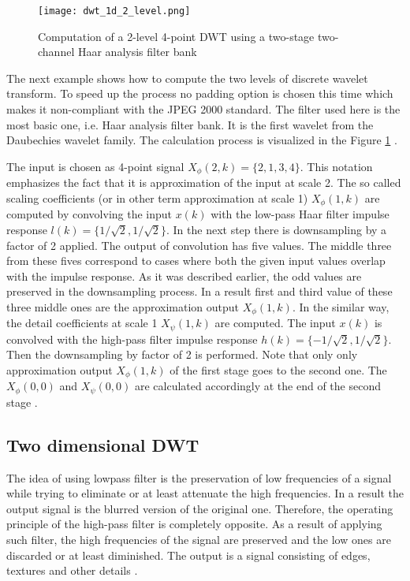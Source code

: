 \begin{figure}
    \centering
    \texttt{[image: dwt\_1d\_2\_level.png]}
    \caption{Computation of a 2-level 4-point DWT using a two-stage two-channel Haar analysis filter bank \cite{dwt_impl}}
    \label{fig:dwt_1d_2_level}
\end{figure}

The next example shows how to compute the two levels of discrete wavelet transform. To speed up the process
no padding option is chosen this time which makes it non-compliant with the JPEG 2000 standard.
The filter used here is the most basic one, i.e. Haar analysis filter bank. It is the first wavelet
from the Daubechies wavelet family. The calculation process is visualized in the Figure \ref{fig:dwt_1d_2_level} \cite{dwt_impl}.

The input is chosen as 4-point signal $X_{\phi}(2, k) = \{2, 1, 3, 4\}$. This notation emphasizes the fact
that it is approximation of the input at scale 2. The so called scaling coefficients (or in other term
approximation at scale 1) $X_{\phi}(1, k)$ are computed by convolving the input $x(k)$ with the low-pass
Haar filter impulse response $l(k) = \{1/\sqrt{2}, 1/\sqrt{2}\}$. In the next step there is downsampling
by a factor of 2 applied. The output of convolution has five values. The middle three from these fives 
correspond to cases where both the given input values overlap with the impulse response. As it was described
earlier, the odd values are preserved in the downsampling process. In a result first and third value of these
three middle ones are the approximation output $X_{\phi}(1, k)$. In the similar way, the detail coefficients
at scale 1 $X_{\psi}(1, k)$ are computed. The input $x(k)$ is convolved with the high-pass filter impulse
response $h(k) = \{-1/\sqrt{2}, 1/\sqrt{2}\}$. Then the downsampling by factor of 2 is performed.
Note that only only approximation output $X_{\phi}(1, k)$ of the first stage goes to the second one.
The $X_{\phi}(0, 0)$ and $X_{\psi}(0, 0)$ are calculated accordingly at the end of the second stage \cite{dwt_impl}.

\subsection{Two dimensional DWT}

The idea of using lowpass filter is the preservation of low frequencies of a signal while trying
to eliminate or at least attenuate the high frequencies. In a result the output signal is the blurred
version of the original one. Therefore, the operating principle of the high-pass filter is completely
opposite. As a result of applying such filter, the high frequencies of the signal are preserved and
the low ones are discarded or at least diminished. The output is a signal consisting of edges, textures
and other details \cite{jpeg_suite}.

